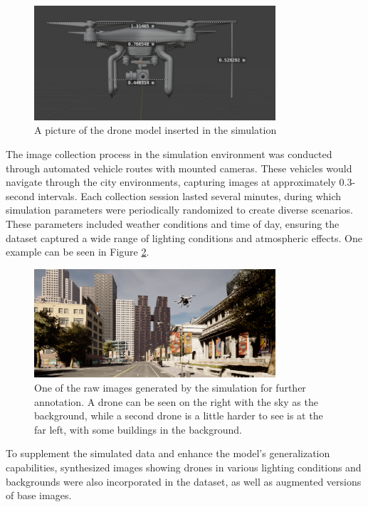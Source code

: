 \begin{figure} [!ht]
    \centering
    \includegraphics[width=0.8\textwidth]{parts/figuras/drone-dimensions.jpg}
    \caption{A picture of the drone model inserted in the simulation}
    \label{fig:drone-dimensions}
\end{figure}

The image collection process in the simulation environment was conducted through automated vehicle routes with mounted cameras. These vehicles would navigate through the city environments, capturing images at approximately 0.3-second intervals. Each collection session lasted several minutes, during which simulation parameters were periodically randomized to create diverse scenarios. These parameters included weather conditions and time of day, ensuring the dataset captured a wide range of lighting conditions and atmospheric effects. One example can be seen in Figure \ref{fig:drone-simulation-capture}.

\begin{figure} [!ht]
    \centering
    \includegraphics[width=0.8\textwidth]{parts/figuras/drone-simulation-capture.png}
    \caption{One of the raw images generated by the simulation for further annotation. A drone can be seen on the right with the sky as the background, while a second drone is a little harder to see is at the far left, with some buildings in the background.}
    \label{fig:drone-simulation-capture}
\end{figure}

To supplement the simulated data and enhance the model's generalization capabilities, synthesized images showing drones in various lighting conditions and backgrounds were also incorporated in the dataset, as well as augmented versions of base images.

